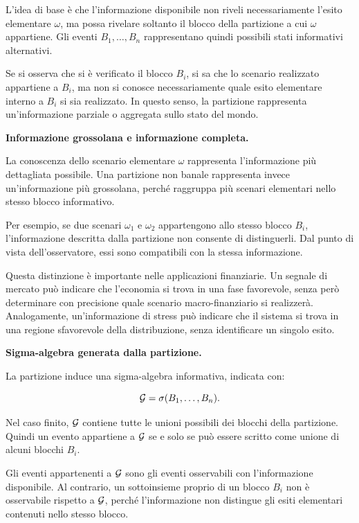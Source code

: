 L'idea di base \`{e} che l'informazione disponibile non riveli necessariamente l'esito elementare $\omega$, ma possa rivelare soltanto il blocco della partizione a cui $\omega$ appartiene. Gli eventi $B_1,\ldots,B_n$ rappresentano quindi possibili stati informativi alternativi.

Se si osserva che si \`{e} verificato il blocco $B_i$, si sa che lo scenario realizzato appartiene a $B_i$, ma non si conosce necessariamente quale esito elementare interno a $B_i$ si sia realizzato. In questo senso, la partizione rappresenta un'informazione parziale o aggregata sullo stato del mondo.

\medskip

\noindent
\textbf{Informazione grossolana e informazione completa.}

La conoscenza dello scenario elementare $\omega$ rappresenta l'informazione pi\`{u} dettagliata possibile. Una partizione non banale rappresenta invece un'informazione pi\`{u} grossolana, perch\'{e} raggruppa pi\`{u} scenari elementari nello stesso blocco informativo.

Per esempio, se due scenari $\omega_1$ e $\omega_2$ appartengono allo stesso blocco $B_i$, l'informazione descritta dalla partizione non consente di distinguerli. Dal punto di vista dell'osservatore, essi sono compatibili con la stessa informazione.

Questa distinzione \`{e} importante nelle applicazioni finanziarie. Un segnale di mercato pu\`{o} indicare che l'economia si trova in una fase favorevole, senza per\`{o} determinare con precisione quale scenario macro-finanziario si realizzer\`{a}. Analogamente, un'informazione di stress pu\`{o} indicare che il sistema si trova in una regione sfavorevole della distribuzione, senza identificare un singolo esito.

\medskip

\noindent
\textbf{Sigma-algebra generata dalla partizione.}

La partizione induce una sigma-algebra informativa, indicata con:

\[
\mathcal{G}
=
\sigma(B_1,\ldots,B_n).
\]

Nel caso finito, $\mathcal{G}$ contiene tutte le unioni possibili dei blocchi della partizione. Quindi un evento appartiene a $\mathcal{G}$ se e solo se pu\`{o} essere scritto come unione di alcuni blocchi $B_i$.

Gli eventi appartenenti a $\mathcal{G}$ sono gli eventi osservabili con l'informazione disponibile. Al contrario, un sottoinsieme proprio di un blocco $B_i$ non \`{e} osservabile rispetto a $\mathcal{G}$, perch\'{e} l'informazione non distingue gli esiti elementari contenuti nello stesso blocco.

